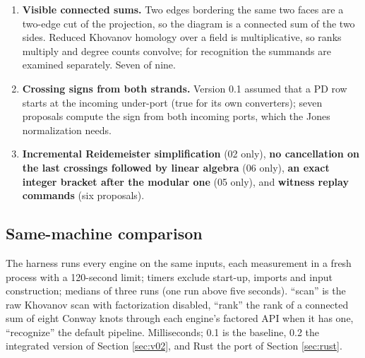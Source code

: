 \begin{enumerate}
  states with equal matchings are merged; there is no multiplicity factor.
\item \textbf{Visible connected sums.} Two edges bordering the same two faces
  are a two-edge cut of the projection, so the diagram is a connected sum of
  the two sides. Reduced Khovanov homology over a field is multiplicative, so
  ranks multiply and degree counts convolve; for recognition the summands are
  examined separately. Seven of nine.
\item \textbf{Crossing signs from both strands.} Version 0.1 assumed that a PD
  row starts at the incoming under-port (true for its own converters); seven
  proposals compute the sign from both incoming ports, which the Jones
  normalization needs.
\item \textbf{Incremental Reidemeister simplification} (02 only), \textbf{no
  cancellation on the last crossings followed by linear algebra} (06 only),
  \textbf{an exact integer bracket after the modular one} (05 only), and
  \textbf{witness replay commands} (six proposals).
\end{enumerate}

\subsection{Same-machine comparison}
The harness  runs every engine on the
same inputs, each measurement in a fresh process with a 120-second limit;
timers exclude start-up, imports and input construction; medians of three runs
(one run above five seconds). ``scan'' is the raw Khovanov scan with
factorization disabled, ``rank'' the rank of a connected sum of eight Conway
knots through each engine's factored API when it has one, ``recognize'' the
default pipeline. Milliseconds; 0.1 is the baseline, 0.2 the integrated
version of Section \ref{sec:v02}, and Rust the port of Section \ref{sec:rust}.

\begin{center}\scriptsize\setlength{\tabcolsep}{3.2pt}
\end{center}

